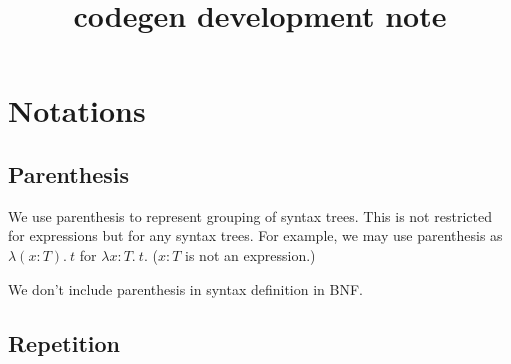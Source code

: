 \documentclass[a4paper,fleqn]{article}
\title{codegen development note}
\newcommand{\lam}[2]{\lambda #1.\:#2}
\begin{document}
\maketitle

\section{Notations}\label{sec:notations}

\subsection{Parenthesis}

We use parenthesis to represent grouping of syntax trees.
This is not restricted for expressions but for any syntax trees.
For example, we may use parenthesis as $\lam{(x{:}T)}{t}$ for $\lam{x{:}T}{t}$.
($x{:}T$ is not an expression.)

We don't include parenthesis in syntax definition in BNF.

\subsection{Repetition}
\end{document}
